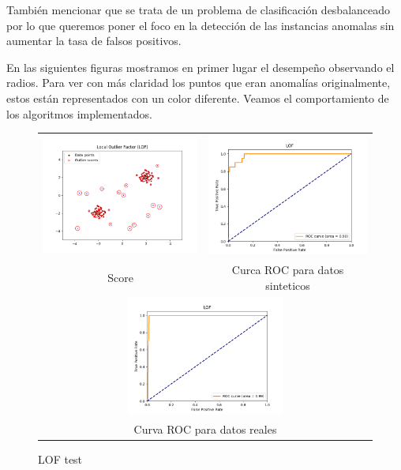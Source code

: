 También mencionar que se trata de un problema de clasificación desbalanceado por lo que
queremos poner el foco en la detección de las instancias anomalas sin aumentar la tasa
de falsos positivos.

En las siguientes figuras mostramos en primer lugar el desempeño observando el
radios. Para ver con más claridad los puntos que eran anomalías originalmente, 
estos están representados con un color diferente. Veamos el comportamiento de
los algoritmos implementados.




\begin{figure}[H]
    \begin{tabular}{cc}
      \includegraphics[width=65mm,height=40mm]{imagenes/lof-sintetico.png} &   \includegraphics[width=65mm,height=40mm]{imagenes/lof-sintetic-roc.png} \\
    Score & Curca ROC para datos sinteticos \\[6pt]
    \multicolumn{2}{c}{\includegraphics[width=65mm,height=39mm]{imagenes/lof-test.png} }\\
    \multicolumn{2}{c}{Curva ROC para datos reales}
    \end{tabular}
    \caption{\label{fig:loftest} LOF test}
\end{figure}

